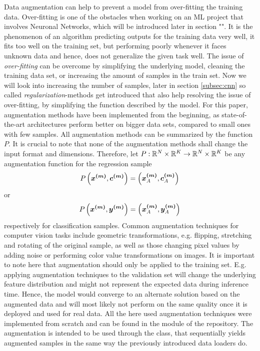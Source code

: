 Data augmentation can help to prevent a model from over-fitting the training data.
Over-fitting is one of the obstacles  when working on an ML project that involves Neuronal Networks, which will be introduced later in section "".
It is the phenomenon of an algorithm predicting outputs for the training data very well, it fits too well on the training set, but performing poorly whenever it faces unknown data and hence, does not generalize the given task well.
The issue of \textit{over-fitting} can be overcome by simplifying the underlying model, cleaning the training data set, or increasing the amount of samples in the train set.
Now we will look into increasing the number of samples, later in section \ref{subsec:cnn} so called \textit{regularization}-methods get introduced that also help resolving the issue of over-fitting, by simplifying the function described by the model.
For this paper, augmentation methods have been implemented from the beginning, as state-of-the-art architectures perform better on bigger data sets, compared to small ones with few samples.
All augmentation methods can be summarized by the function $P$.
It is crucial to note that none of the augmentation methods shall change the input format and dimensions.
Therefore, let $P: \mathbb{R}^{N}\times \mathbb{R}^{K} \rightarrow \mathbb{R}^{N}\times \mathbb{R}^{K}$ be any augmentation function for the regression sample
\begin{align}
    P\left(\bm{x^{(m)}}, \bm{c^{(m)}}\right) = \left(\bm{x^{(m)}}_A, \bm{c^{(m)}}_A\right)
\end{align}
or
\begin{align}
    P\left(\bm{x^{(m)}}, \bm{y^{(m)}}\right) = \left(\bm{x^{(m)}}_A, \bm{y^{(m)}}_A\right)
\end{align}
respectively for classification samples.
Common augmentation techniques for computer vision tasks include geometric transformations, e.g. flipping, stretching and rotating of the original sample, as well as those changing pixel values by adding noise or performing color value transformations on images.
It is important to note here that augmentation should only be applied to the training set.
E.g. applying augmentation techniques to the validation set will change the underlying feature distribution and might not represent the expected data during inference time.
Hence, the model would converge to an alternate solution based on the augmented data and will most likely not perform on the same quality once it is deployed and used for real data.
All the here used augmentation techniques were implemented from scratch and can be found in the  module of the repository.
The augmentation is intended to be used through the  class, that sequentially yields augmented samples in the same way the previously introduced data loaders do.
